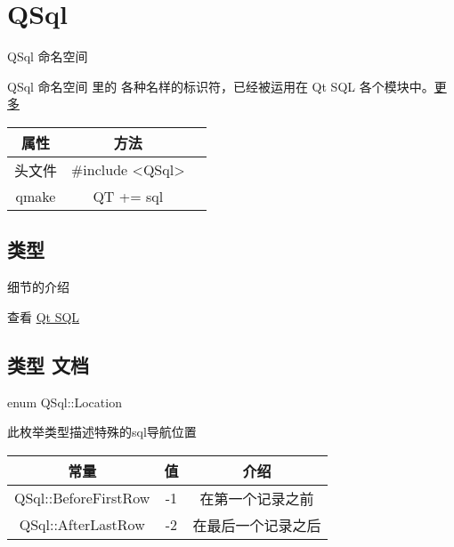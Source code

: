 \chapter{QSql}
QSql 命名空间

QSql 命名空间 里的 各种名样的标识符，已经被运用在 Qt SQL 各个模块中。\href{https://doc.qt.io/qt-5/qsql.html#details}{更多} 

\begin{tabular}{|c|c|p{1.5cm}|}
	\hline
	属性 & 方法 \\
	\hline
	头文件 & \#include <QSql>\\      
	\hline
	qmake & QT += sql\\      
	\hline
\end{tabular}

\section{类型}


细节的介绍 

查看 \href{https://doc.qt.io/qt-5/qtsql-index.html}{Qt SQL}

\section{类型 文档}

enum QSql::Location


此枚举类型描述特殊的sql导航位置


\begin{tabular}{|c|c|c|}
	\hline
	常量	& 值 & 介绍 \\
	\hline
	QSql::BeforeFirstRow&-1&在第一个记录之前\\
	\hline
	QSql::AfterLastRow&-2&在最后一个记录之后\\
	\hline
\end{tabular}

